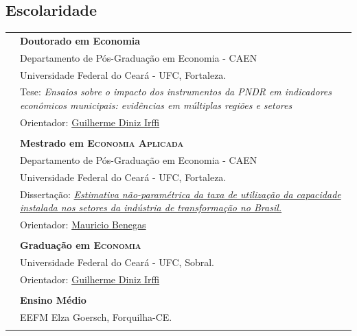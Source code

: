 \documentclass[a4paper,12pt]{article}
\begin{document}
	\subsection*{Escolaridade}
	\setlength{\LTleft}{0pt}
	\begin{longtable}[t]{>{\raggedleft\arraybackslash}p{2.0cm}>{\raggedright\arraybackslash}p{13.5cm}}
		2025 & \textbf{Doutorado em Economia} \\
		& Departamento de Pós-Graduação em Economia - CAEN \\
		& Universidade Federal do Ceará - UFC, Fortaleza. \\
		& Tese: \textit{Ensaios sobre o impacto dos instrumentos da PNDR em indicadores econômicos municipais: evidências em múltiplas regiões e setores} \\
		& Orientador: \href{http://lattes.cnpq.br/8821559850261716}{Guilherme Diniz Irffi} \\
		\multicolumn{2}{c}{\vspace{-0.2cm}} \\

		2016 & \textbf{Mestrado em \textsc{Economia Aplicada}} \\
		& Departamento de Pós-Graduação em Economia - CAEN \\
		& Universidade Federal do Ceará - UFC, Fortaleza. \\
		& Dissertação: \href{http://repositorio.ufc.br/handle/riufc/29291}{\textit{Estimativa não-paramétrica da taxa de utilização da capacidade instalada nos setores da indústria de transformação no Brasil.}} \\
		& Orientador: \href{http://lattes.cnpq.br/6095762582986164}{Mauricio Benegas} \\
		\multicolumn{2}{c}{\vspace{-0.2cm}} \\

		2013 & \textbf{Graduação em \textsc{Economia}} \\
		& Universidade Federal do Ceará - UFC, Sobral. \\
		& Orientador: \href{http://lattes.cnpq.br/8821559850261716}{Guilherme Diniz Irffi} \\
		\multicolumn{2}{c}{\vspace{-0.2cm}} \\

		2006 & \textbf{Ensino Médio} \\
		& EEFM Elza Goersch, Forquilha-CE. \\
		\multicolumn{2}{c}{\vspace{-0.2cm}} \\
	\end{longtable}
\end{document}
